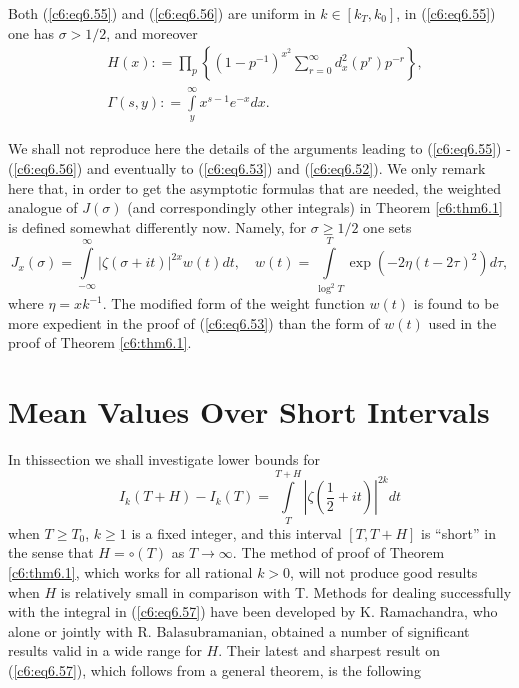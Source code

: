 Both (\ref{c6:eq6.55}) and (\ref{c6:eq6.56}) are uniform in $k \in
[k_T, k_0]$, in (\ref{c6:eq6.55}) one has $\sigma > 1/2$, and moreover 
\begin{align*}
& H(x) : = \prod_p \left\{(1-p^{-1})^{x^2} \sum\limits^\infty_{r=0}
  d^2_x (p^r) p^{-r} \right\},\\ 
& \Gamma (s,y) : = \int\limits^{\infty}_y x^{s-1} e^{-x} dx. 
\end{align*}

We shall not reproduce here the details of the arguments leading to
(\ref{c6:eq6.55}) - (\ref{c6:eq6.56}) and eventually to
(\ref{c6:eq6.53}) and (\ref{c6:eq6.52}). We only remark here that, in
order to get the asymptotic formulas that are needed, the weighted
analogue of $J(\sigma)$ (and correspondingly other integrals) in
Theorem \ref{c6:thm6.1} is defined somewhat differently now. Namely,
for $\sigma \geq 1/2$ one sets 
$$
J_x (\sigma) = \int\limits^\infty_{-\infty} |\zeta(\sigma + it)|^{2x}
w (t) dt,\quad w(t) = \int\limits^T_{\log^2 T} \exp \left(-2\eta(t - 2
\tau)^2\right) 
d \tau, 
$$
where $\eta = x k^{-1}$. The modified form of the weight function
$w(t)$ is found to be more expedient in the proof of (\ref{c6:eq6.53})
than the form of $w(t)$ used in the proof of Theorem \ref{c6:thm6.1}. 

\section{Mean Values Over Short Intervals}\label{c6:sec6.4}

In this\pageoriginale section we shall investigate lower bounds for 
\begin{equation}
I_k (T + H) - I_k (T) = \int\limits^{T+H}_T
\left|\zeta\left(\frac{1}{2} + it\right)\right|^{2k}
dt\label{c6:eq6.57}  
\end{equation}
when $T \geq T_0$, $k \geq 1$ is a fixed integer, and this interval
$[T, T+H]$ is ``short'' in the sense that $H = \circ (T)$ as $T \to
\infty$. The method of proof of Theorem \ref{c6:thm6.1}, which works
for all rational $k>0$, will not produce good results when $H$ is
relatively small in comparison with T. Methods for dealing
successfully with the integral in (\ref{c6:eq6.57}) have been
developed by K. Ramachandra, who alone or jointly with
R. Balasubramanian, obtained a number of significant results valid in
a wide range for $H$. Their latest and sharpest result on
(\ref{c6:eq6.57}), which follows from a general theorem, is the
following 

